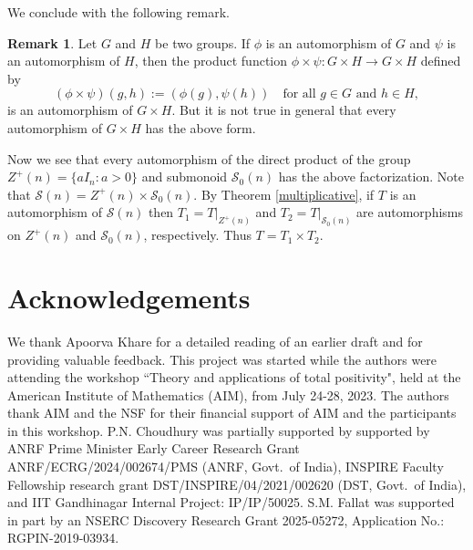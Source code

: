 \documentclass[11pt,reqno]{amsart}
\theoremstyle{plain}
\theoremstyle{definition}
\newtheorem{rem}[theorem]{Remark}
\numberwithin{equation}{section}
\def\cS{\mathcal S}
\begin{document}
We conclude with the following remark.
\begin{rem}
  Let $G$ and $H$ be two groups. If $\phi$ is an automorphism of $G$ and $\psi$ is an automorphism of $H$, then the product function $\phi \times \psi: G \times H \to G \times H$ defined by
\[(\phi \times \psi )(g, h) := (\phi (g), \psi(h))\quad \text{for all } g\in G \text{ and } h\in H,\]
is an automorphism of $G \times H$. But it is not true in general that every automorphism of $G \times H$ has the above form. 

Now we see that  every automorphism of the direct product of the group $Z^+(n)=\{aI_n: a>0\}$ and submonoid $\cS_0(n)$ has the above factorization.  Note that $\cS(n)= Z^+(n) \times  \cS_0(n)$. By Theorem \ref{multiplicative}, if $T$ is an automorphism of $\cS(n)$ then $T_1=T |_{Z^+(n)}$ and $T_2=T|_{\cS_0(n)}$ are automorphisms on $Z^+(n)$ and $\cS_0(n)$, respectively. Thus $T=T_1\times T_2$. 
\end{rem}


\section*{Acknowledgements}
	We thank Apoorva Khare for a detailed reading of an earlier draft and for providing valuable feedback. This project was started while the authors were attending the workshop “Theory and applications of total positivity", held at the
American Institute of Mathematics (AIM), from July 24-28, 2023. The authors thank AIM and the NSF for their financial support of AIM and the participants in this workshop.  P.N. Choudhury was partially supported by supported by ANRF Prime Minister Early Career Research Grant ANRF/ECRG/2024/002674/PMS (ANRF, Govt.~of India), INSPIRE Faculty Fellowship research grant DST/INSPIRE/04/2021/002620
(DST, Govt.~of India), and IIT Gandhinagar Internal Project: IP/IP/50025. S.M. Fallat was supported in part by an NSERC Discovery Research Grant 2025-05272, Application No.: RGPIN-2019-03934. 
\end{document}
